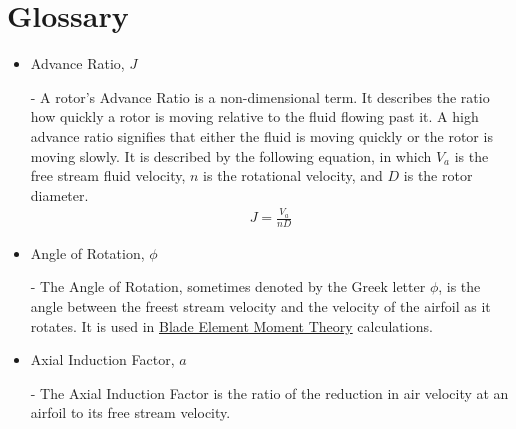 \documentclass{article}
\begin{document}
\section{Glossary}
\begin{itemize}
	
	\item \hypertarget{J}{Advance Ratio, $J$} - A rotor's Advance Ratio is a non-dimensional term. It describes the ratio how quickly a rotor is moving relative to the fluid flowing past it. A high advance ratio signifies that either the fluid is moving quickly or the rotor is moving slowly. It is described by the following equation, in which $V_{a}$ is the free stream fluid velocity, $n$ is the rotational velocity, and $D$ is the rotor diameter.
	\begin{equation}
	\begin{aligned}
		J = \frac{V_{a}}{n D}
	\end{aligned}
	\end{equation}
	
	\item \hypertarget{phi}{Angle of Rotation, $\phi$} - The Angle of Rotation, sometimes denoted by the Greek letter $\phi$, is the angle between the freest stream velocity and the velocity of the airfoil as it rotates. It is used in \hyperlink{BEM}{Blade Element Moment Theory} calculations.

	\item \hypertarget{a}{Axial Induction Factor, $a$} - The Axial Induction Factor is the ratio of the reduction in air velocity at an airfoil to its free stream velocity.
	

\end{itemize}
\end{document}
